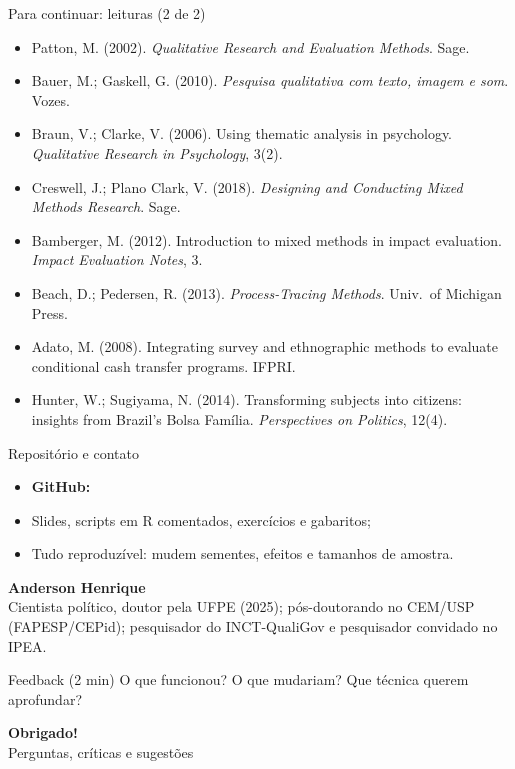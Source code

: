 \begin{frame}{Para continuar: leituras (2 de 2)}
  \scriptsize
  \begin{itemize}
    \item Patton, M. (2002). \emph{Qualitative Research and Evaluation Methods}. Sage.
    \item Bauer, M.; Gaskell, G. (2010). \emph{Pesquisa qualitativa com texto, imagem e som}. Vozes.
    \item Braun, V.; Clarke, V. (2006). Using thematic analysis in psychology. \emph{Qualitative Research in Psychology}, 3(2).
    \item Creswell, J.; Plano Clark, V. (2018). \emph{Designing and Conducting Mixed Methods Research}. Sage.
    \item Bamberger, M. (2012). Introduction to mixed methods in impact evaluation. \emph{Impact Evaluation Notes}, 3.
    \item Beach, D.; Pedersen, R. (2013). \emph{Process-Tracing Methods}. Univ.\ of Michigan Press.
    \item Adato, M. (2008). Integrating survey and ethnographic methods to evaluate conditional cash transfer programs. IFPRI.
    \item Hunter, W.; Sugiyama, N. (2014). Transforming subjects into citizens: insights from Brazil's Bolsa Família. \emph{Perspectives on Politics}, 12(4).
  \end{itemize}
\end{frame}

\begin{frame}{Repositório e contato}
  \begin{itemize}
    \item \textbf{GitHub:} 
    \item Slides, scripts em R comentados, exercícios e gabaritos;
    \item Tudo reproduzível: mudem sementes, efeitos e tamanhos de amostra.
  \end{itemize}
  \vspace{0.1cm}
  \textbf{Anderson Henrique}\\
  {\small Cientista político, doutor pela UFPE (2025); pós-doutorando no CEM/USP (FAPESP/CEPid); pesquisador do INCT-QualiGov e pesquisador convidado no IPEA.\\
  }
  \vspace{0.1cm}
  \begin{exerciciobox}{Feedback (2 min)}
    \small O que funcionou? O que mudariam? Que técnica querem aprofundar?
  \end{exerciciobox}
\end{frame}

\begin{frame}
  \centering\vspace{1.2cm}
  {\Huge\bfseries\color{azul} Obrigado!}\\[0.5cm]
  {\large Perguntas, críticas e sugestões}
\end{frame}
